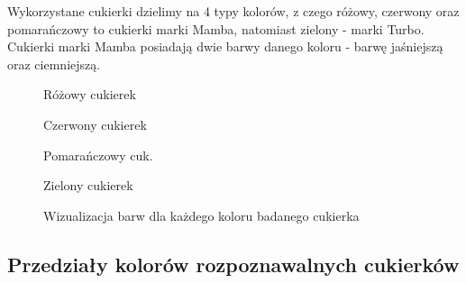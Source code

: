 \documentclass{article}
\begin{document}
Wykorzystane cukierki dzielimy na 4 typy kolorów, z czego różowy, czerwony oraz pomarańczowy to cukierki marki Mamba, natomiast zielony - marki Turbo. Cukierki marki Mamba posiadają dwie barwy danego koloru - barwę jaśniejszą oraz ciemniejszą.

\begin{figure}[H]
    \centering
    \begin{tcolorbox}[colback=white]

    \begin{multicols}{4}
    Różowy cukierek
    \begin{tcolorbox}[colback=my-pink-dark, width=\linewidth, colframe=my-pink-dark]
    \end{tcolorbox}
    Czerwony cukierek
    \begin{tcolorbox}[colback=my-red-dark, width=\linewidth, colframe=my-red-dark]
    \end{tcolorbox}
    Pomarańczowy cuk.
    \begin{tcolorbox}[colback=my-orange-dark, width=\linewidth, colframe=my-orange-dark]
    \end{tcolorbox}
    Zielony cukierek
    \begin{tcolorbox}[colback=my-green, width=\linewidth, colframe=my-green]
    \end{tcolorbox}
    \end{multicols}

    \begin{multicols}{4}
    \begin{tcolorbox}[colback=my-pink-light, width=\linewidth, colframe=my-pink-light]
    \end{tcolorbox}
    \begin{tcolorbox}[colback=my-red-light, width=\linewidth, colframe=my-red-light]
    \end{tcolorbox}
    \begin{tcolorbox}[colback=my-orange-light, width=\linewidth, colframe=my-orange-light]
    \end{tcolorbox}
    \end{multicols}

    \end{tcolorbox}
    \caption{Wizualizacja barw dla każdego koloru badanego cukierka}
\end{figure}


\subsection{Przedziały kolorów rozpoznawalnych cukierków}
\end{document}
